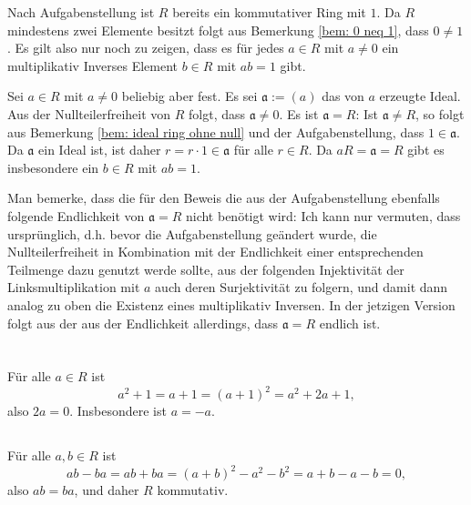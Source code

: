 \documentclass[a4paper,10pt]{article}
\theoremstyle{definition}
\newcommand{\mf}[1]{\mathfrak{#1}}
\begin{document}
Nach Aufgabenstellung ist $R$ bereits ein kommutativer Ring mit $1$. Da $R$ mindestens zwei Elemente besitzt folgt aus Bemerkung \ref{bem: 0 neq 1}, dass $0 \neq 1$. Es gilt also nur noch zu zeigen, dass es für jedes $a \in R$ mit $a \neq 0$ ein multiplikativ Inverses Element $b \in R$ mit $ab = 1$ gibt.

Sei $a \in R$ mit $a \neq 0$ beliebig aber fest. Es sei $\mf{a} := (a)$ das von $a$ erzeugte Ideal. Aus der Nullteilerfreiheit von $R$ folgt, dass $\mf{a} \neq 0$. Es ist $\mf{a} = R$: Ist $\mf{a} \neq R$, so folgt aus Bemerkung \ref{bem: ideal ring ohne null} und der Aufgabenstellung, dass $1 \in \mf{a}$. Da $\mf{a}$ ein Ideal ist, ist daher $r = r \cdot 1 \in \mf{a}$ für alle $r \in R$. Da $aR = \mf{a} = R$ gibt es insbesondere ein $b \in R$ mit $ab = 1$.

Man bemerke, dass die für den Beweis die aus der Aufgabenstellung ebenfalls folgende Endlichkeit von $\mf{a} = R$ nicht benötigt wird: Ich kann nur vermuten, dass ursprünglich, d.h. bevor die Aufgabenstellung geändert wurde, die Nullteilerfreiheit in Kombination mit der Endlichkeit einer entsprechenden Teilmenge dazu genutzt werde sollte, aus der folgenden Injektivität der Linksmultiplikation mit $a$ auch deren Surjektivität zu folgern, und damit dann analog zu oben die Existenz eines multiplikativ Inversen. In der jetzigen Version folgt aus der aus der Endlichkeit allerdings, dass $\mf{a} = R$ endlich ist.





\section{}


\addtocounter{subsection}{1}
\subsection{}
Für alle $a \in R$ ist
\[
 a^2 + 1 = a+1 = (a+1)^2 = a^2 + 2a + 1,
\]
also $2a = 0$. Insbesondere ist $a = -a$.


\addtocounter{subsection}{-2}
\subsection{}
Für alle $a,b \in R$ ist
\[
 ab-ba = ab + ba = (a+b)^2 - a^2 - b^2 = a+b-a-b = 0,
\]
also $ab = ba$, und daher $R$ kommutativ.


\addtocounter{subsection}{1}
\end{document}
